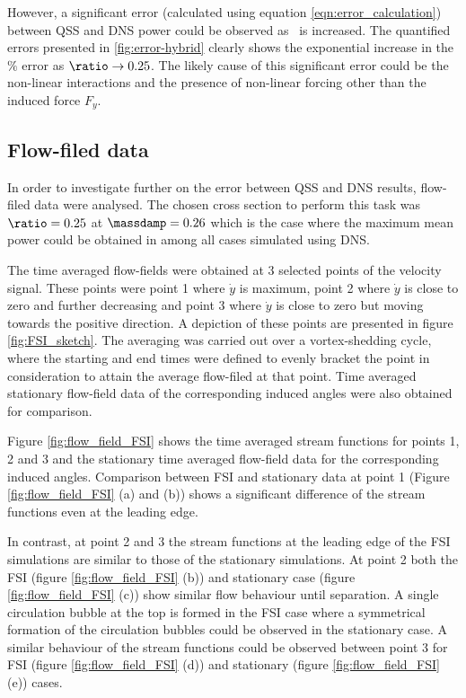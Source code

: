 However, a significant error (calculated using equation \ref{eqn:error_calculation}) between QSS and DNS power could be observed as \ratio\ is increased. The quantified errors presented in \ref{fig:error-hybrid} clearly shows the exponential increase in the $\%$ error as $\ratio \rightarrow 0.25$. The likely cause of this significant error could be the non-linear interactions and the presence of non-linear forcing other than the induced force $F_{y}$.



 
\subsection{Flow-filed data}
 
 In order to investigate further on the error between QSS and DNS results, flow-filed data were analysed. The chosen cross section to perform this task was $\ratio=0.25$ at $\massdamp=0.26$ which is the case where the maximum mean power could be obtained in among all cases simulated using DNS. 
 


The time averaged flow-fields were obtained at 3 selected points of the velocity signal. These points were point 1 where $\dot{y}$ is maximum, point 2 where $\dot{y}$ is close to zero and further decreasing and point 3 where $\dot{y}$ is close to zero but moving towards the positive direction. A depiction of these points are presented in figure \ref{fig:FSI_sketch}. The averaging was carried out over a vortex-shedding cycle, where the starting and end times were defined to evenly bracket the point in consideration to attain the average flow-filed at that point. Time averaged stationary flow-field data of the corresponding induced angles were also obtained for comparison.




Figure \ref{fig:flow_field_FSI} shows the time averaged stream functions for points 1, 2 and 3 and the stationary time averaged flow-field data for the corresponding induced angles. Comparison between FSI and stationary data at point 1 (Figure \ref{fig:flow_field_FSI} (a) and (b)) shows a significant difference of the stream functions even at the leading edge.

In contrast, at point 2 and 3 the stream functions at the leading edge of the FSI simulations are similar to those of the stationary simulations. At point 2 both the FSI (figure \ref{fig:flow_field_FSI} (b)) and stationary  case (figure \ref{fig:flow_field_FSI} (c)) show similar flow behaviour until separation. A single circulation bubble at the top is formed in the FSI case where a symmetrical formation of the circulation bubbles could be observed in the stationary case. A similar behaviour of the stream functions could be observed between point 3 for FSI (figure \ref{fig:flow_field_FSI} (d)) and stationary (figure \ref{fig:flow_field_FSI} (e)) cases. 

